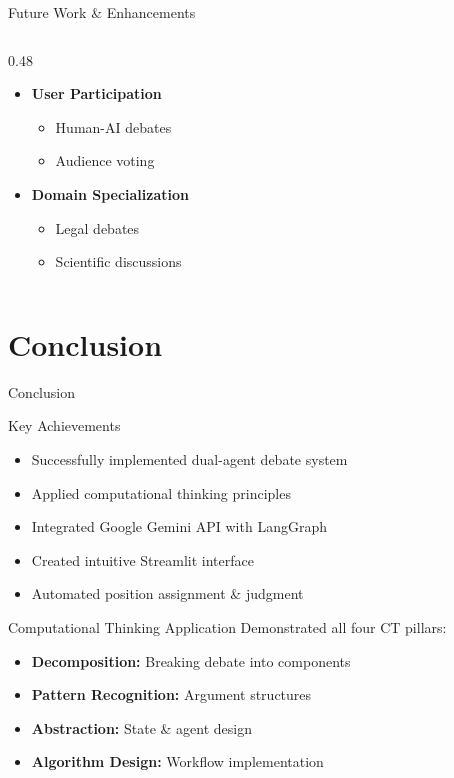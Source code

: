 \documentclass[aspectratio=169]{beamer}
\begin{document}
\begin{frame}{Future Work \& Enhancements}
\begin{columns}[t]
\begin{column}{0.48\textwidth}
\begin{itemize}
                \item \textbf{User Participation}
                \begin{itemize}
                    \footnotesize
                    \item Human-AI debates
                    \item Audience voting
                \end{itemize}
                
                \item \textbf{Domain Specialization}
                \begin{itemize}
                    \footnotesize
                    \item Legal debates
                    \item Scientific discussions
                \end{itemize}
            \end{itemize}
        \end{column}
    \end{columns}
\end{frame}

\section{Conclusion}
\begin{frame}{Conclusion}
    \begin{block}{Key Achievements}
        \footnotesize
        \begin{itemize}
            \item Successfully implemented dual-agent debate system
            \item Applied computational thinking principles
            \item Integrated Google Gemini API with LangGraph
            \item Created intuitive Streamlit interface
            \item Automated position assignment \& judgment
        \end{itemize}
    \end{block}
    
    \vspace{0.2cm}
    
    \begin{block}{Computational Thinking Application}
        \footnotesize
        Demonstrated all four CT pillars:
        \begin{itemize}
            \item \textbf{Decomposition:} Breaking debate into components
            \item \textbf{Pattern Recognition:} Argument structures
            \item \textbf{Abstraction:} State \& agent design
            \item \textbf{Algorithm Design:} Workflow implementation
        \end{itemize}
    \end{block}
\end{frame}
\end{document}
